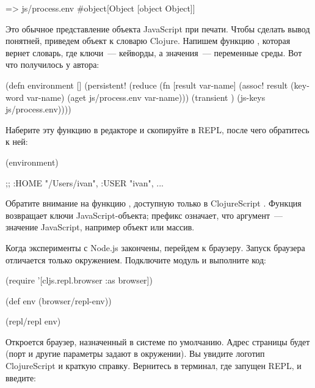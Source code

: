 \begin{english}
  \begin{clojure}
=> js/process.env
#object[Object [object Object]]
  \end{clojure}
\end{english}

Это обычное представление объекта JavaScript при печати. Чтобы сделать вывод понятней, приведем объект к словарю Clojure. Напишем функцию , которая вернет словарь, где ключи~--- кейворды, а значения~--- переменные среды. Вот что получилось у автора:

\begin{english}
  \begin{clojure/lines}
(defn environment []
  (persistent!
   (reduce
    (fn [result var-name]
      (assoc! result
              (keyword var-name)
              (aget js/process.env var-name)))
    (transient {})
    (js-keys js/process.env))))
  \end{clojure/lines}
\end{english}

Наберите эту функцию в редакторе и скопируйте в REPL, после чего обратитесь к ней:

\begin{english}
  \begin{clojure}
(environment)

;; {:HOME "/Users/ivan", :USER "ivan", ...}
  \end{clojure}
\end{english}

Обратите внимание на функцию , доступную только в ClojureScript . Функция возвращает ключи JavaScript-объекта; префикс  означает, что аргумент~--- значение JavaScript, например объект или массив.

Когда эксперименты с Node.js закончены, перейдем к браузеру. Запуск браузера отличается только окружением. Подключите модуль  и выполните код:

\begin{english}
  \begin{clojure}
(require '[cljs.repl.browser :as browser])

(def env (browser/repl-env))

(repl/repl env)
  \end{clojure}
\end{english}

Откроется браузер, назначенный в системе по умолчанию. Адрес страницы будет  (порт и другие параметры задают в окружении). Вы увидите логотип ClojureScript и краткую справку. Вернитесь в терминал, где запущен REPL, и введите:

